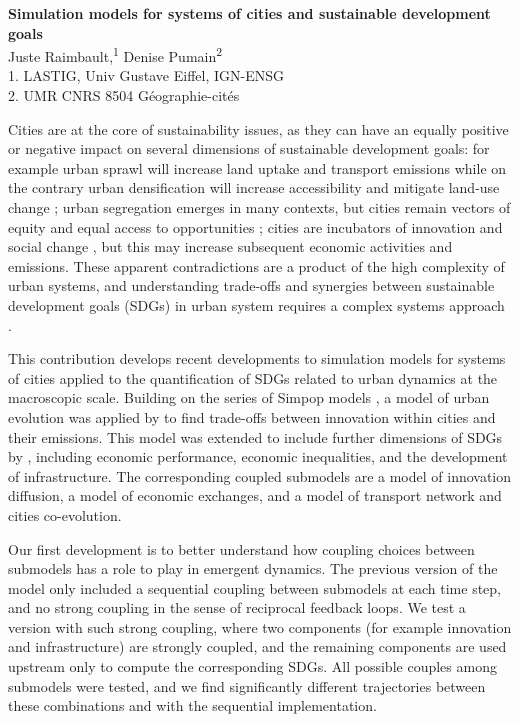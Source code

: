 \documentclass[11pt]{article}
\renewcommand{\title}[1]{{\noindent\large\bfseries#1\medskip\\}}
\renewcommand{\author}[2]{{\noindent #1 \medskip\\ \small #2 \medskip\\}}
\begin{document}
\title{Simulation models for systems of cities and sustainable development goals}
\author{
Juste Raimbault,\textsuperscript{1}
Denise Pumain\textsuperscript{2}
}
{
1. LASTIG, Univ Gustave Eiffel, IGN-ENSG\\
2. UMR CNRS 8504 G{\'e}ographie-cit{\'e}s
}


Cities are at the core of sustainability issues, as they can have an equally positive or negative impact on several dimensions of sustainable development goals: for example urban sprawl will increase land uptake and transport emissions while on the contrary urban densification will increase accessibility and mitigate land-use change \cite{naess2020urban}; urban segregation emerges in many contexts, but cities remain vectors of equity and equal access to opportunities \cite{vaughan2011challenges}; cities are incubators of innovation and social change \cite{pumain2008socio}, but this may increase subsequent economic activities and emissions. These apparent contradictions are a product of the high complexity of urban systems, and understanding trade-offs and synergies between sustainable development goals (SDGs) in urban system requires a complex systems approach \cite{zhao2021synergies}.

This contribution develops recent developments to simulation models for systems of cities applied to the quantification of SDGs related to urban dynamics at the macroscopic scale. Building on the series of Simpop models \cite{pumain2011multi}, a model of urban evolution was applied by \cite{raimbault2022trade} to find trade-offs between innovation within cities and their emissions. This model was extended to include further dimensions of SDGs by \cite{raimbault2022complex}, including economic performance, economic inequalities, and the development of infrastructure. The corresponding coupled submodels are a model of innovation diffusion, a model of economic exchanges, and a model of transport network and cities co-evolution.

Our first development is to better understand how coupling choices between submodels has a role to play in emergent dynamics. The previous version of the model only included a sequential coupling between submodels at each time step, and no strong coupling in the sense of reciprocal feedback loops. We test a version with such strong coupling, where two components (for example innovation and infrastructure) are strongly coupled, and the remaining components are used upstream only to compute the corresponding SDGs. All possible couples among submodels were tested, and we find significantly different trajectories between these combinations and with the sequential implementation.
\end{document}
